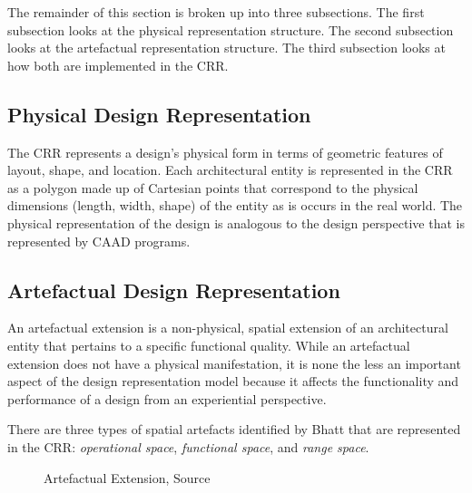 \documentclass[12pt]{ucthesis}
\begin{document}
The remainder of this section is broken up into three subsections. The first subsection looks at the physical representation structure. The second subsection looks at the artefactual representation structure. The third subsection looks at how both are implemented in the CRR.

\subsection{Physical Design Representation}
The CRR represents a design's physical form in terms of geometric features of layout, shape, and location. Each architectural entity is represented in the CRR as a polygon made up of Cartesian points that correspond to the physical dimensions (length, width, shape) of the entity as is occurs in the real world. The physical representation of the design is analogous to the design perspective that is represented by CAAD programs. 


\subsection{Artefactual Design Representation}
An artefactual extension is a non-physical, spatial extension of an architectural entity that pertains to a specific functional quality. While an artefactual extension does not have a physical manifestation, it is none the less an important aspect of the design representation model because it affects the functionality and performance of a design from an experiential perspective. 

There are three types of spatial artefacts identified by Bhatt\cite{BhattDH09} that are represented in the CRR: \emph{operational space}, \emph{functional space}, and \emph{range space}.


\begin{figure}[H]
 \centering
 \hspace{7 mm}
 \caption{Artefactual Extension, Source \cite{bhatt-spatial-computing}}
\label{artefactual-extensions}
\end{figure}
\end{document}
